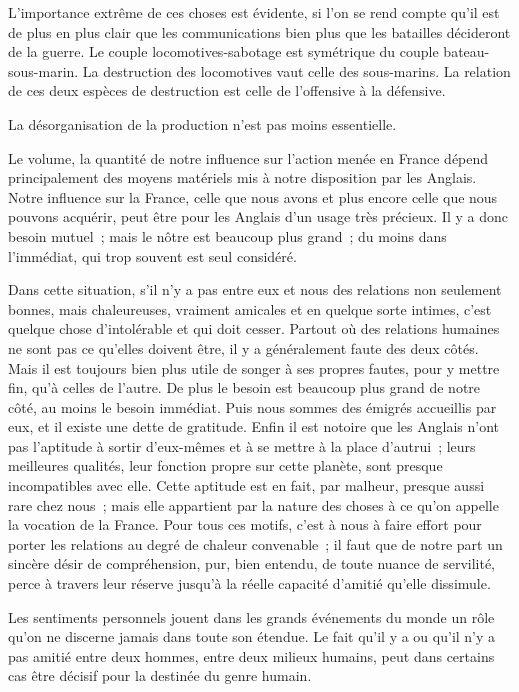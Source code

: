 \documentclass[french,twoside]{book} %
\begin{document}
L'importance extrême de ces choses est évidente, si l'on se rend compte qu'il est de plus en plus clair que les communications bien plus que les batailles décideront de la guerre. Le couple locomotives-sabotage est symétrique du couple bateau-sous-marin. La destruction des locomotives vaut celle des sous-marins. La relation de ces deux espèces de destruction est celle de l'offensive à la défensive.\par
La désorganisation de la production n'est pas moins essentielle.\par
Le volume, la quantité de notre influence sur l'action menée en France dépend principalement des moyens matériels mis à notre disposition par les Anglais. Notre influence sur la France, celle que nous avons et plus encore celle que nous pouvons acquérir, peut être pour les Anglais d'un usage très précieux. Il y a donc besoin mutuel ; mais le nôtre est beaucoup plus grand ; du moins dans l'immédiat, qui trop souvent est seul considéré.\par
Dans cette situation, s'il n'y a pas entre eux et nous des relations non seulement bonnes, mais chaleureuses, vraiment amicales et en quelque sorte intimes, c'est quelque chose d'intolérable et qui doit cesser. Partout où des relations humaines ne sont pas ce qu'elles doivent être, il y a généralement faute des deux côtés. Mais il est toujours bien plus utile de songer à ses propres fautes, pour y mettre fin, qu'à celles de l'autre. De plus le besoin est beaucoup plus grand de notre côté, au moins le besoin immédiat. Puis nous sommes des émigrés accueillis par eux, et il existe une dette de gratitude. Enfin il est notoire que les Anglais n'ont pas l'aptitude à sortir d'eux-mêmes et à se mettre à la place d'autrui ; leurs meilleures qualités, leur fonction propre sur cette planète, sont presque incompatibles avec elle. Cette aptitude est en fait, par malheur, presque aussi rare chez nous ; mais elle appartient par la nature des choses à ce qu'on appelle la vocation de la France. Pour tous ces motifs, c'est à nous à faire effort pour porter les relations au degré de chaleur convenable ; il faut que de notre part un sincère désir de compréhension, pur, bien entendu, de toute nuance de servilité, perce à travers leur réserve jusqu'à la réelle capacité d'amitié qu'elle dissimule.\par
Les sentiments personnels jouent dans les grands événements du monde un rôle qu'on ne discerne jamais dans toute son étendue. Le fait qu'il y a ou qu'il n'y a pas amitié entre deux hommes, entre deux milieux humains, peut dans certains cas être décisif pour la destinée du genre humain.\par
\end{document}
